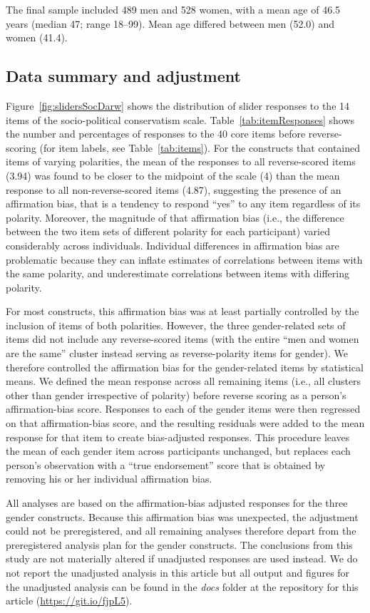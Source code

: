 \documentclass[fignum,man]{apa}\usepackage[]{graphicx}\usepackage[]{color}
\begin{document}
The final sample included 489 men and 528 women, with a mean age of 
46.5 years
 (median 47;
range 18--99). 
Mean age differed between men (52.0) and women (41.4). 


\subsection{Data summary and adjustment}
Figure~\ref{fig:slidersSocDarw} shows the distribution
of slider responses to the 14 items of the socio-political conservatism scale.
Table~\ref{tab:itemResponses}
shows the number and percentages of responses to the 40 core
items before
reverse-scoring (for item labels, see Table~\ref{tab:items}).
For the constructs that contained items of varying polarities,
the mean of the responses to all reverse-scored items (3.94)
was found to be 
closer to the midpoint of the scale (4) than the mean response to all non-reverse-scored
items (4.87), suggesting the presence of an
affirmation bias, that is a tendency to respond ``yes'' to any item regardless of
its polarity. Moreover, the magnitude of that affirmation bias (i.e., the difference 
between the two item sets of different polarity for each participant) varied
considerably across individuals. Individual differences in 
affirmation bias are problematic because they can inflate estimates
of correlations between items with the same polarity, and 
underestimate correlations between items with differing polarity.

For most constructs, this affirmation bias was at least partially controlled
by the inclusion of items of both polarities. However, the three gender-related sets 
of items did not include any reverse-scored items (with the entire ``men and women are the same''
cluster instead serving as reverse-polarity items for gender). 
We therefore
controlled the affirmation
bias for the gender-related items by statistical means.
We defined the mean response across all remaining items (i.e., all clusters other than
gender irrespective of polarity) before reverse scoring
as a person's affirmation-bias score. 
Responses to each of the gender items were then regressed
on that affirmation-bias score, and the resulting residuals were added
to the mean response for that item to create bias-adjusted responses. 
This procedure leaves the mean of each gender item across participants unchanged,
but replaces each person's observation with a ``true endorsement'' score that
is obtained by removing his or her individual affirmation bias.

All
analyses are based on the affirmation-bias adjusted responses for the three 
gender constructs.
Because this affirmation bias was unexpected, the
adjustment could not be preregistered, and all remaining analyses
therefore depart from the preregistered analysis plan for the gender
constructs. The conclusions from this study are not materially altered if 
unadjusted responses are used instead. We do not report the 
unadjusted analysis in this article but all output and figures for the unadjusted
analysis can be found in the \textit{docs} folder at the repository for this
article (\url{https://git.io/fjpL5}).
\end{document}
